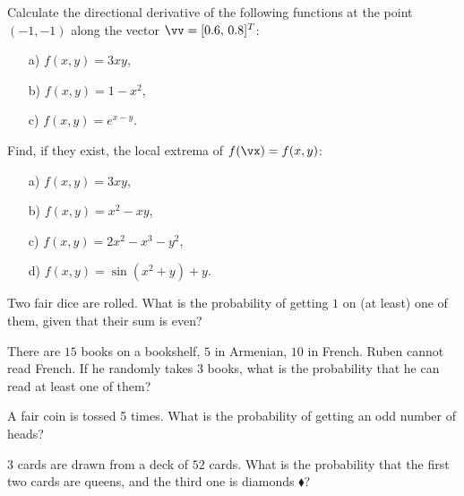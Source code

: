 \begin{problem}[1 point]
Calculate the directional derivative of the following functions at the point $(-1,-1)$ along the vector $\vv=[0.6,\,0.8]^T$:
\begin{enumerate}
    \item[a) ] $f(x,y) = 3xy$,
    \item[b) ] $f(x,y) = 1-x^2$,
    \item[c) ] $f(x,y) = e^{x-y}$.
    \end{enumerate}
\end{problem}

\bigskip


\begin{problem}[2 points]
Find, if they exist, the local extrema of $f(\vx)=f(x,y)$:
\begin{enumerate}
    \item[a) ] $f(x,y) = 3xy$,
    \item[b) ] $f(x,y) = x^2-xy$,
    \item[c) ] $f(x, y) = 2x^2 - x^3 - y^2$,
    \item[d) ] $f(x,y) =\sin(x^2 + y) + y$.
    \end{enumerate}
\end{problem}
\bigskip


        
\begin{problem}[0.5 points]
Two fair dice are rolled. What is the probability of getting $1$ on (at least) one of them, given that their sum is even?
\end{problem}
\bigskip



\begin{problem}[0.5 points]
There are $15$ books on a bookshelf, $5$ in Armenian, $10$ in French. Ruben cannot read French. If he randomly takes $3$ books, what is the probability that he can read at least one of them?
\end{problem}

\bigskip

\begin{problem}[0.5 points]
A fair coin is tossed 5 times. What is the probability of getting an odd number of heads?
\end{problem}

\bigskip

\begin{problem}[0.5 points]
$3$ cards are drawn from a deck of $52$ cards. What is the probability that the first two cards are queens, and the third one is diamonds $\blacklozenge$?
\end{problem}
